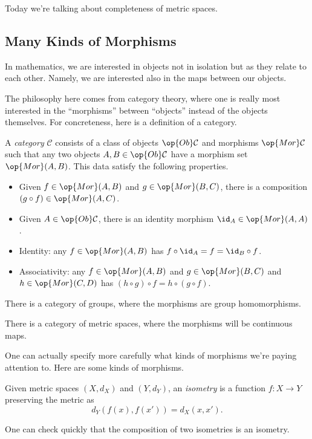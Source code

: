 \documentclass[../notes.tex]{subfiles}
\begin{document}
Today we're talking about completeness of metric spaces.

\subsection{Many Kinds of Morphisms}
In mathematics, we are interested in objects not in isolation but as they relate to each other. Namely, we are interested also in the maps between our objects.

The philosophy here comes from category theory, where one is really most interested in the ``morphisms'' between ``objects'' instead of the objects themselves. For concreteness, here is a definition of a category.
\begin{definition}[Category]
	A \textit{category} $\mathcal C$ consists of a class of objects $\op{Ob}\mathcal C$ and morphisms $\op{Mor}\mathcal C$ such that any two objects $A,B\in\op{Ob}\mathcal C$ have a morphism set $\op{Mor}(A,B)$. This data satisfy the following properties.
	\begin{itemize}
		\item Given $f\in\op{Mor}(A,B)$ and $g\in\op{Mor}(B,C)$, there is a composition $(g\circ f)\in\op{Mor}(A,C)$.
		\item Given $A\in\op{Ob}\mathcal C$, there is an identity morphism ${\id_A}\in\op{Mor}(A,A)$.
		\item Identity: any $f\in\op{Mor}(A,B)$ has $f\circ{\id_A}=f={\id_B}\circ f$.
		\item Associativity: any $f\in\op{Mor}(A,B)$ and $g\in\op{Mor}(B,C)$ and $h\in\op{Mor}(C,D)$ has $(h\circ g)\circ f=h\circ (g\circ f)$.
	\end{itemize}
\end{definition}
\begin{example}
	There is a category of groups, where the morphisms are group homomorphisms.
\end{example}
\begin{example}
	There is a category of metric spaces, where the morphisms will be continuous maps.
\end{example}
One can actually specify more carefully what kinds of morphisms we're paying attention to. Here are some kinds of morphisms.
\begin{definition}[Isometry]
	Given metric spaces $(X,d_X)$ and $(Y,d_Y)$, an \textit{isometry} is a function $f\colon X\to Y$ preserving the metric as
	\[d_Y(f(x),f(x'))=d_X(x,x').\]
\end{definition}
One can check quickly that the composition of two isometries is an isometry.
\end{document}
